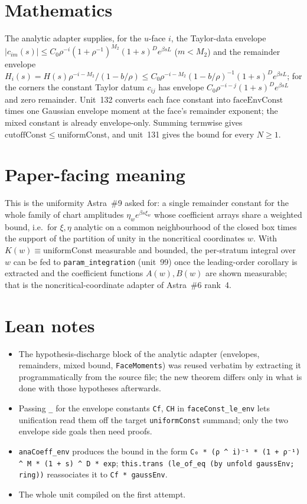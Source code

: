 \documentclass[11pt]{article}
\begin{document}
\section{Mathematics}

The analytic adapter supplies, for the $u$-face $i$, the Taylor-data envelope
$|c_{im}(s)|\le C_0\rho^{-i}(1+\rho^{-1})^{M_2}(1+s)^De^{\beta sL}$ ($m<M_2$) and the remainder
envelope $H_i(s)=H(s)\rho^{-i-M_2}/(1-b/\rho)\le C_0\rho^{-i-M_2}(1-b/\rho)^{-1}(1+s)^De^{\beta sL}$;
for the corners the constant Taylor datum $c_{ij}$ has envelope $C_0\rho^{-i-j}(1+s)^De^{\beta sL}$
and zero remainder. Unit~132 converts each face constant into $\mathrm{faceEnvConst}$ times one
Gaussian envelope moment at the face's remainder exponent; the mixed constant is already
envelope-only. Summing termwise gives $\mathrm{cutoffConst}\le\mathrm{uniformConst}$, and unit~131
gives the bound for every $N\ge1$.

\section{Paper-facing meaning}

This is the uniformity Astra~\#9 asked for: a single remainder constant for the whole family of
chart amplitudes $\eta_we^{\beta s\xi_w}$ whose coefficient arrays share a weighted bound, i.e.\ for
$\xi,\eta$ analytic on a common neighbourhood of the closed box times the support of the partition
of unity in the noncritical coordinates $w$. With $K(w)\equiv\mathrm{uniformConst}$ measurable and
bounded, the per-stratum integral over $w$ can be fed to \texttt{param\_integration} (unit~99) once
the leading-order corollary is extracted and the coefficient functions $A(w),B(w)$ are shown
measurable; that is the noncritical-coordinate adapter of Astra~\#6 rank~4.

\section{Lean notes}

\begin{itemize}
\item The hypothesis-discharge block of the analytic adapter (envelopes, remainders, mixed bound,
\texttt{FaceMoments}) was reused verbatim by extracting it programmatically from the source file;
the new theorem differs only in what is done with those hypotheses afterwards.
\item Passing \texttt{\_} for the envelope constants \texttt{Cf}, \texttt{CH} in
\texttt{faceConst\_le\_env} lets unification read them off the target
\texttt{uniformConst} summand; only the two envelope side goals then need proofs.
\item \texttt{anaCoeff\_env} produces the bound in the form
\texttt{C₀ * (ρ \^{} i)⁻¹ * (1 + ρ⁻¹) \^{} M * (1 + s) \^{} D * exp}; \texttt{this.trans (le\_of\_eq
(by unfold gaussEnv; ring))} reassociates it to \texttt{Cf * gaussEnv}.
\item The whole unit compiled on the first attempt.
\end{itemize}
\end{document}
